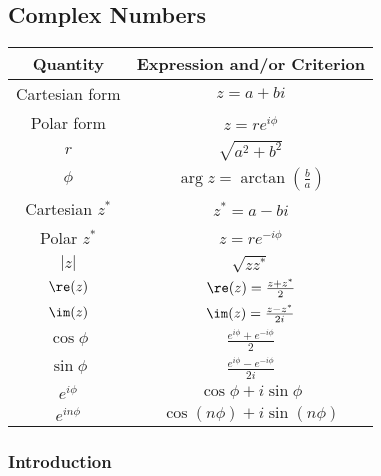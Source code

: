 \documentclass[10pt]{mypackage}
\begin{document}
\subsection{Complex Numbers}%
\begin{center}
  \renewcommand{\arraystretch}{1.75}
  \begin{tabular}{c|c}
    Quantity & Expression and/or Criterion\\
    \hline
    Cartesian form & $z = a + bi$\\
    Polar form & $z = re^{i\phi}$\\
    $r$ & $\sqrt{a^2 + b^2}$\\
    $\phi$ & $\arg z = \arctan\left(\frac{b}{a}\right)$\\
    \hline
    Cartesian $z^{\ast}$ & $z^{\ast} = a-bi$\\
    Polar $z^{\ast}$ & $z = re^{-i\phi}$\\
    $|z|$ & $\sqrt{zz^{\ast}}$\\
    \hline
    $\re(z)$ & $\re(z) = \frac{z + z^{\ast}}{2}$\\
    $\im(z)$ & $\im(z) = \frac{z - z^{\ast}}{2i}$\\
    $\cos\phi$ & $\frac{e^{i\phi} + e^{-i\phi}}{2}$\\
    $\sin\phi$ & $\frac{e^{i\phi} - e^{-i\phi}}{2i}$\\
    \hline
    $e^{i\phi}$ & $\cos \phi + i\sin\phi$\\
    $e^{in\phi}$ & $\cos \left(n\phi\right) + i\sin \left(n\phi\right)$
  \end{tabular}
\end{center}
\subsubsection{Introduction}%
\end{document}
